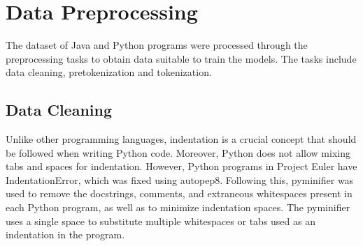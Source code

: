 \section{Data Preprocessing}
The dataset of Java and Python programs were processed through the preprocessing tasks to obtain data suitable to train the models. The tasks include data cleaning, pretokenization and tokenization.

\subsection{Data Cleaning}
Unlike other programming languages, indentation is a crucial concept that should be followed when writing Python code. Moreover, Python does not allow mixing tabs and spaces for indentation. However, Python programs in Project Euler have IndentationError, which was fixed using autopep8. Following this, pyminifier was used to remove the docstrings, comments, and extraneous whitespaces present in each Python program, as well as to minimize indentation spaces. The pyminifier uses a single space to substitute multiple whitespaces or tabs used as an indentation in the program.

